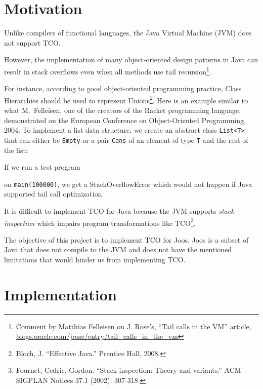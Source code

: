 \documentclass{tufte-handout}
\begin{document}
\section{Motivation}
Unlike compilers of functional languages, the Java Virtual Machine (JVM) does not support TCO. 

However, the implementation of many object-oriented design patterns in Java can result in stack overflows even when all methods use tail recursion\footnote{Comment by Matthias Felleisen on J. Rose's, ``Tail calls in the VM'' article, \href{https://blogs.oracle.com/jrose/entry/tail_calls_in_the_vm}{blogs.oracle.com/jrose/entry/tail\_calls\_in\_the\_vm}}.

For instance, according to good object-oriented programming practice, Class Hierarchies should be used to represent Unions\footnote{Bloch, J. ``Effective Java.'' Prentice Hall, 2008.}. Here is an example similar to what M.~Felleisen, one of the creators of the Racket programming language, demonstrated on the European Conference on Object-Oriented Programming, 2004.
To implement a list data structure, we create an abstract class \verb'List<T>' that can either be \verb'Empty' or a pair \verb'Cons' of an element of type \verb'T' and the rest of the list:


If we run a test program


\noindent on \verb'main(100000)', we get a StackOverflowError which would not happen if Java supported tail call optimization.

It is difficult to implement TCO for Java because the JVM supports \textit{stack inspection} which impairs program transformations like TCO\footnote{Fournet, Cedric, Gordon. ``Stack inspection: Theory and variants.'' ACM SIGPLAN Notices 37.1 (2002): 307-318.}.

The objective of this project is to implement TCO for Joos. Joos is a subset of Java that does not compile to the JVM and does not have the mentioned limitations that would hinder us from implementing TCO.

\section{Implementation}
\end{document}
